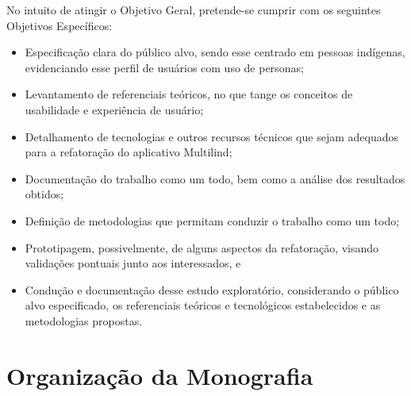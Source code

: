 \begin{description}
    \item No intuito de atingir o Objetivo Geral, pretende-se cumprir com os seguintes Objetivos Específicos:
          \begin{itemize}
              \item Especificação clara do público alvo, sendo esse centrado em pessoas indígenas, evidenciando esse perfil de usuários com uso de personas;

              \item Levantamento de referenciais teóricos, no que tange os conceitos de usabilidade e experiência de usuário;

              \item Detalhamento de tecnologias e outros recursos técnicos que sejam adequados para a refatoração do aplicativo Multilind;

              \item Documentação do trabalho como um todo, bem como a análise dos resultados obtidos;

              \item Definição de metodologias que permitam conduzir o trabalho como um todo;
              
              \item Prototipagem, possivelmente, de alguns aspectos da refatoração, visando validações pontuais junto aos interessados, e

              \item Condução e documentação desse estudo exploratório, considerando o público alvo especificado, os referenciais teóricos e tecnológicos estabelecidos e
              as metodologias propostas.
          \end{itemize}
\end{description}

\section{Organização da Monografia}
\label{sec:OrganizacaodaMonografia}

